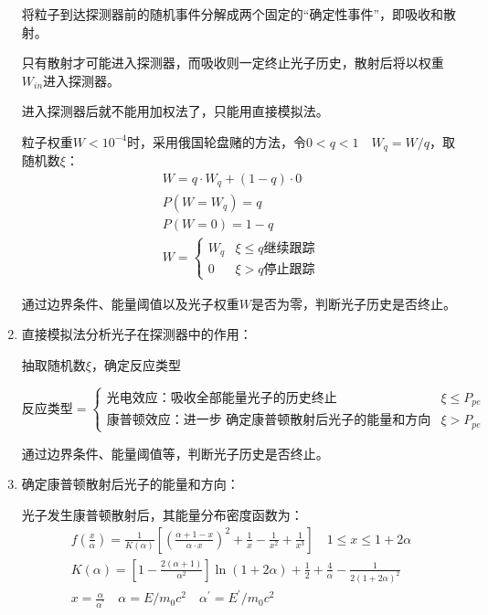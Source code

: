 \documentclass{article}
\begin{document}
\begin{enumerate}[label=\Alph*.]
    将粒子到达探测器前的随机事件分解成两个固定的“确定性事件”，即吸收和散射。
    
    只有散射才可能进入探测器，而吸收则一定终止光子历史，散射后将以权重$W_{in}$进入探测器。

    进入探测器后就不能用加权法了，只能用直接模拟法。

    粒子权重$W<10^{-4}$时，采用俄国轮盘赌的方法，令$0 < q < 1\quad W_q = W / q$，取随机数$\xi $：
    \begin{equation}
        \begin{gathered}
            W = q \cdot W_q + (1 - q) \cdot 0 \\
            P(W = W_q) = q \\
            P(W = 0) = 1 - q \\
            W=
        \begin{cases}
            W_q&\xi\leq q\text{继续跟踪}\\
            0&\xi> q\text{停止跟踪}
        \end{cases}
        \end{gathered}
    \end{equation}

    通过边界条件、能量阈值以及光子权重$W$是否为零，判断光子历史是否终止。

    \item 直接模拟法分析光子在探测器中的作用：
    
    抽取随机数$\xi $，确定反应类型
    
    \begin{equation}
        \text{反应类型} = \begin{cases}
            \text{光电效应：吸收全部能量光子的历史终止} & \xi  \leq P_{pe} \\
            \text{康普顿效应：进一步
            确定康普顿散射后光子的能量和方向} &  \xi  > P_{pe}
        \end{cases}
    \end{equation}

    通过边界条件、能量阈值等，判断光子历史是否终止。

    
    
    \item 确定康普顿散射后光子的能量和方向：
    
    光子发生康普顿散射后，其能量分布密度函数为：
    \begin{equation}
        \begin{gathered}
            f(\frac x{\alpha})=\frac1{K(\alpha)}\left[\left(\frac{\alpha+1-x}{\alpha\cdot x}\right)^2+\frac1x-\frac1{x^2}+\frac1{x^3}\right]\quad1\leq x\leq1+2\alpha \\
            K(\alpha)=\left[1-\frac{2(\alpha+1)}{\alpha^2}\right]\ln(1+2\alpha)+\frac12+\frac4\alpha-\frac1{2(1+2\alpha)^2}\\
            x= \frac{\alpha}  {\alpha ^{\prime }}\quad \alpha = E/ m_0c^2\quad \alpha ^{\prime }= E^{\prime }/ m_0c^2
        \end{gathered}
    \end{equation}


\end{enumerate}
\end{document}
